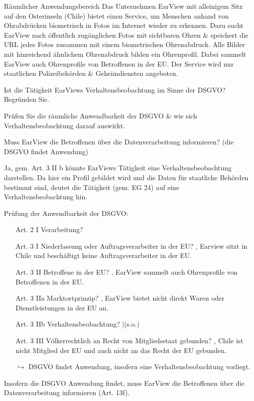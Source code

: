\documentclass{article}
\begin{document}
\begin{eexercises}{Räumlicher Anwendungsbereich}{
    Das Unternehmen EarView mit alleinigem Sitz auf den Osterinseln (Chile) bietet einen Service, um Menschen anhand von Ohrabdrücken biometrisch in Fotos im Internet wieder zu erkennen. Dazu sucht EarView nach öffentlich zugänglichen Fotos mit sichtbaren Ohren \& speichert die URL jedes Fotos zusammen mit einem biometrischen Ohrenabdruck. Alle Bilder mit hinreichend ähnlichem Ohrenabdruck bilden ein Ohrenprofil. Dabei sammelt EarView auch Ohrenprofile von Betroffenen in der EU. Der Service wird nur staatlichen Polizeibehörden \& Geheimdiensten angeboten.
  }
  \item Ist die Tätigkeit EarViews Verhaltensbeobachtung im Sinne der DSGVO? Begründen Sie.
  \item Prüfen Sie die räumliche Anwendbarkeit der DSGVO \& wie sich Verhaltensbeobachtung darauf auswirkt.
  \item Muss EarView die Betroffenen über die Datenverarbeitung informieren? (die DSGVO findet Anwendung)
\end{eexercises}

\begin{solutions}
  \item Ja, gem. Art. 3 II b könnte EarViews Tätigkeit eine Verhaltensbeobachtung darstellen. Da hier ein Profil gebildet wird und die Daten für staatliche Behörden bestimmt sind, deutet die Tätigkeit (gem. EG 24) auf eine Verhaltensbeobachtung hin.
  \item Prüfung der Anwendbarkeit der DSGVO:
  \begin{itemize}
    \item[Art. 2 I] Verarbeitung? \checkmark
    \item[Art. 3 I] Niederlassung oder Auftragsverarbeiter in der EU? \xmark, Earview sitzt in Chile und beschäftigt keine Auftragsverarbeiter in der EU.
    \item[Art. 3 II] Betroffene in der EU? \checkmark, EarView sammelt auch Ohrenprofile von Betroffenen in der EU.
    \item[Art. 3 IIa] Marktortprinzip? \xmark, EarView bietet nicht direkt Waren oder Dienstleistungen in der EU an.
    \item[Art. 3 IIb] Verhaltensbeobachtung? \checkmark$|$\xmark (s.o.)
    \item[Art. 3 III] Völkerrechtlich an Recht von Mitgliedsstaat gebunden? \xmark, Chile ist nicht Mitglied der EU und auch nicht an das Recht der EU gebunden.
    \item[$\hookrightarrow$] DSGVO findet Anwendung, insofern eine Verhaltensbeobachtung vorliegt.
  \end{itemize}
  \item Insofern die DSGVO Anwendung findet, muss EarView die Betroffenen über die Datenverarbeitung informieren (Art. 13f).
\end{solutions}
\end{document}
